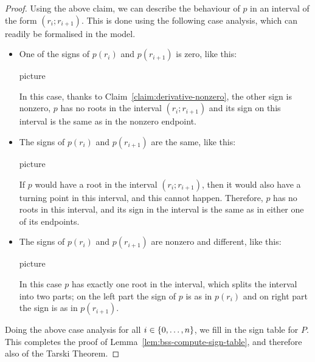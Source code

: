 \begin{proof}
Using the above claim, we can  describe the behaviour of $p$ in an interval of the form $(r_i;r_{i+1})$. This is done using the following case analysis, which can readily be formalised in the \bss model.
	\begin{itemize}
 		\item One of the signs of $p(r_i)$ and $p(r_{i+1})$  is zero, like this:
 		\begin{center}
 			picture
 		\end{center}
 		 In this case, thanks to Claim~\ref{claim:derivative-nonzero}, the other sign is nonzero,   $p$ has no roots in the interval $(r_i;r_{i+1})$ and its sign  on this interval is the same as in the nonzero endpoint. 

		\item The  signs of $p(r_i)$ and $p(r_{i+1})$ are the same, like this:
 		\begin{center}
 			picture
 		\end{center} If $p$ would have a root in the interval $(r_i;r_{i+1})$, then it would also have a turning point in this interval, and this cannot happen. Therefore, $p$ has no roots in this interval, and its sign in the interval is the same as in either one of its endpoints. 
		\item The  signs of $p(r_i)$ and $p(r_{i+1})$ are nonzero and different, like this:
 		\begin{center}
 			picture
 		\end{center} In this case $p$ has exactly one root in the interval, which splits the interval into two parts; on the left part the sign of $p$ is  as in $p(r_i)$ and on right part the sign is as in $p(r_{i+1})$. 
	\end{itemize}
Doing the above case analysis for all $i \in \{0,\ldots,n\}$, we  fill in the sign table for $P$.  This completes the proof of Lemma~\ref{lem:bss-compute-sign-table}, and therefore also of the Tarski Theorem.
\end{proof}
